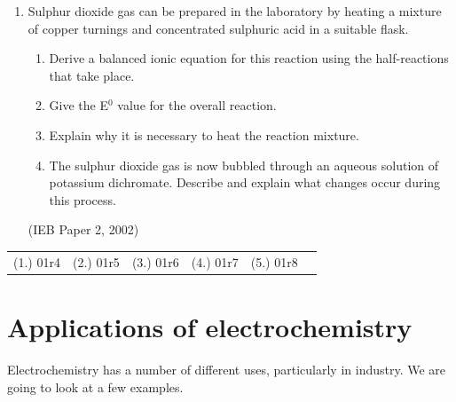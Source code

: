 {\begin{enumerate}
	\begin{enumerate}
	\item{Laboratory solutions of aqueous potassium dichromate are not acidified}
	\item{The E$^{0}$ value for this reaction is only +0.10V}
	\item{The activation energy is too low}
	\item{The reaction is non-spontaneous}
	\end{enumerate}

(IEB Paper 2, 2002)

\item{Sulphur dioxide gas can be prepared in the laboratory by heating a mixture of copper turnings and concentrated sulphuric acid in a suitable flask.}	
	\begin{enumerate}
	\item{Derive a balanced ionic equation for this reaction using the half-reactions that take place.}
	\item{Give the E$^{0}$ value for the overall reaction.}
	\item{Explain why it is necessary to heat the reaction mixture.}
	\item{The sulphur dioxide gas is now bubbled through an aqueous solution of potassium dichromate. Describe and explain what changes occur during this process.}
	\end{enumerate}
(IEB Paper 2, 2002)
\end{enumerate}

\par \practiceinfo
\par \begin{tabular}[h]{cccccc}
(1.)	01r4	&
(2.)	01r5	&
(3.)	01r6	&
(4.)	01r7	&
(5.)	01r8	&
\end{tabular}

}






\section{Applications of electrochemistry}
\label{sec:electrochemical:applications}

Electrochemistry has a number of different uses, particularly in industry. We are going to look at a few examples.

